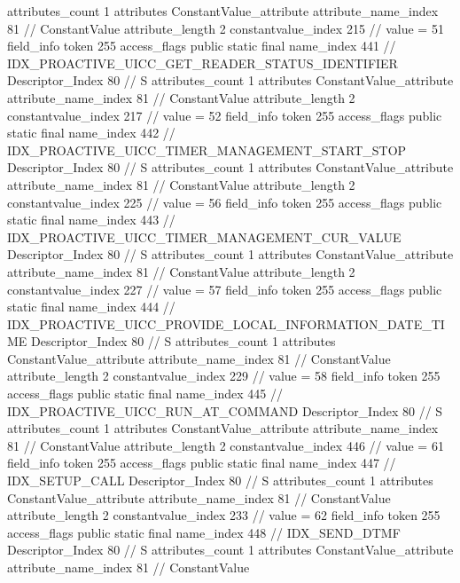 {{{{{				attributes_count	1
				attributes {
				ConstantValue_attribute {
					attribute_name_index	81		// ConstantValue
					attribute_length	2
					constantvalue_index	215		// value = 51
				}
				}
			}
			field_info {
				token	255
				access_flags	public static final
				name_index	441		// IDX_PROACTIVE_UICC_GET_READER_STATUS_IDENTIFIER
				Descriptor_Index	80		// S
				attributes_count	1
				attributes {
				ConstantValue_attribute {
					attribute_name_index	81		// ConstantValue
					attribute_length	2
					constantvalue_index	217		// value = 52
				}
				}
			}
			field_info {
				token	255
				access_flags	public static final
				name_index	442		// IDX_PROACTIVE_UICC_TIMER_MANAGEMENT_START_STOP
				Descriptor_Index	80		// S
				attributes_count	1
				attributes {
				ConstantValue_attribute {
					attribute_name_index	81		// ConstantValue
					attribute_length	2
					constantvalue_index	225		// value = 56
				}
				}
			}
			field_info {
				token	255
				access_flags	public static final
				name_index	443		// IDX_PROACTIVE_UICC_TIMER_MANAGEMENT_CUR_VALUE
				Descriptor_Index	80		// S
				attributes_count	1
				attributes {
				ConstantValue_attribute {
					attribute_name_index	81		// ConstantValue
					attribute_length	2
					constantvalue_index	227		// value = 57
				}
				}
			}
			field_info {
				token	255
				access_flags	public static final
				name_index	444		// IDX_PROACTIVE_UICC_PROVIDE_LOCAL_INFORMATION_DATE_TIME
				Descriptor_Index	80		// S
				attributes_count	1
				attributes {
				ConstantValue_attribute {
					attribute_name_index	81		// ConstantValue
					attribute_length	2
					constantvalue_index	229		// value = 58
				}
				}
			}
			field_info {
				token	255
				access_flags	public static final
				name_index	445		// IDX_PROACTIVE_UICC_RUN_AT_COMMAND
				Descriptor_Index	80		// S
				attributes_count	1
				attributes {
				ConstantValue_attribute {
					attribute_name_index	81		// ConstantValue
					attribute_length	2
					constantvalue_index	446		// value = 61
				}
				}
			}
			field_info {
				token	255
				access_flags	public static final
				name_index	447		// IDX_SETUP_CALL
				Descriptor_Index	80		// S
				attributes_count	1
				attributes {
				ConstantValue_attribute {
					attribute_name_index	81		// ConstantValue
					attribute_length	2
					constantvalue_index	233		// value = 62
				}
				}
			}
			field_info {
				token	255
				access_flags	public static final
				name_index	448		// IDX_SEND_DTMF
				Descriptor_Index	80		// S
				attributes_count	1
				attributes {
				ConstantValue_attribute {
					attribute_name_index	81		// ConstantValue
}}}}}}}

